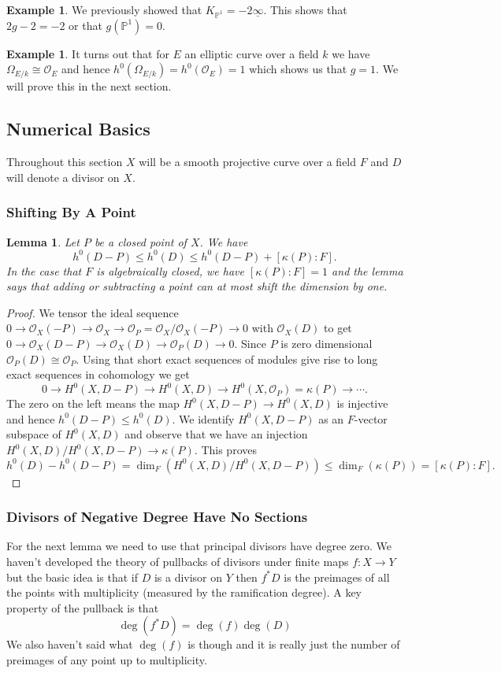 \documentclass[12pt]{article}
\numberwithin{equation}{section}
\newtheorem{lemma}[theorem]{Lemma}
\theoremstyle{definition}
\newtheorem{example}[theorem]{Example}
\theoremstyle{remark}
\newcommand{\Ocal}{\mathcal{O}}
\newcommand{\PP}{\mathbb{P}}
\begin{document}
\begin{example}
	We previously showed that $K_{\PP^1} = -2\underline{\infty}$. 
	This shows that $2g-2=-2$ or that $g(\PP^1)=0$. 
\end{example}

\begin{example}
	It turns out that for $E$ an elliptic curve over a field $k$ we have $\Omega_{E/k} \cong \Ocal_{E}$ and hence $h^0(\Omega_{E/k}) = h^0(\Ocal_E)=1$ which shows 
	us that $g=1$. 
	We will prove this in the next section.
\end{example}

\subsection{Numerical Basics}
Throughout this section $X$ will be a smooth projective curve over a field $F$ and $D$ will denote a divisor on $X$. 

\subsubsection{Shifting By A Point}
\begin{lemma}
Let $P$ be a closed point of $X$. 
We have 
 $$ h^0(D-P) \leq h^0(D) \leq h^0(D-P) + [\kappa(P):F].$$
In the case that $F$ is algebraically closed, we have $[\kappa(P):F]=1$ and the lemma says that adding or subtracting a point can at most shift the dimension by one.
\end{lemma}
\begin{proof}
	We tensor the ideal sequence $0 \to \Ocal_X(-P) \to \Ocal_X \to \Ocal_P=\Ocal_X/\Ocal_X(-P) \to 0$ with $\Ocal_X(D)$ to get $0 \to \Ocal_X(D-P) \to \Ocal_X(D) \to \Ocal_P(D) \to 0$. 
	Since $P$ is zero dimensional $\Ocal_P(D) \cong \Ocal_P$. 
	Using that short exact sequences of modules give rise to long exact sequences in cohomology we get 
	 $$0 \to H^0(X,D-P) \to H^0(X,D) \to H^0(X,\Ocal_P) = \kappa(P) \to \cdots. $$
	The zero on the left means the map $H^0(X,D-P) \to H^0(X,D)$ is injective and hence $h^0(D-P) \leq h^0(D)$. 
	We identify $H^0(X,D-P)$ as an $F$-vector subspace of $H^0(X,D)$ and observe that we have an injection $H^0(X,D)/H^0(X,D-P) \to \kappa(P)$. 
	This proves 
	$$h^0(D) - h^0(D-P) = \dim_F(H^0(X,D)/H^0(X,D-P)) \leq \dim_F(\kappa(P)) = [\kappa(P):F].$$
\end{proof}

\subsubsection{Divisors of Negative Degree Have No Sections}
For the next lemma we need to use that principal divisors have degree zero. 
We haven't developed the theory of pullbacks of divisors under finite maps $f:X\to Y$ but the basic idea is that if $D$ is a divisor on $Y$ then $f^*D$ is the preimages of all the points with multiplicity (measured by the ramification degree).
A key property of the pullback is that 
\begin{equation}\label{eqn:degree-formula}
\deg(f^*D)= \deg(f)\deg(D)
\end{equation}
We also haven't said what $\deg(f)$ is though and it is really just the number of preimages of any point up to multiplicity. 
\end{document}
